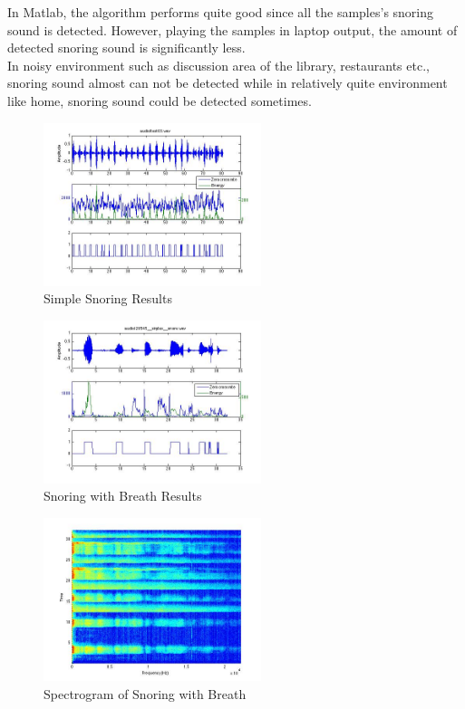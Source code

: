 \documentclass[conference]{IEEEtran}
\begin{document}
In Matlab, the algorithm performs quite good since all the samples's snoring sound is detected. However, playing the samples in laptop output,  the amount of detected snoring sound is significantly less. \\

In noisy environment such as discussion area of the library, restaurants etc., snoring sound almost can not be detected while in relatively quite environment like home, snoring sound could be detected sometimes. \\
\begin{figure}[!t]
\centering
\includegraphics[width=2.5in]{analysis_regular_snore.jpg}
\caption{Simple Snoring Results}
\label{fig:snoring}
\end{figure}

\begin{figure}[!t]
\centering
\includegraphics[width=2.5in]{analysis_with_breath.jpg}
\caption{Snoring with Breath Results}
\label{fig:snoringbreath}
\end{figure}

\begin{figure}[!t]
\centering
\includegraphics[width=2.5in]{spectrogram.jpg}
\caption{Spectrogram of Snoring with Breath}
\label{fig:spectrogram}
\end{figure}
\end{document}
